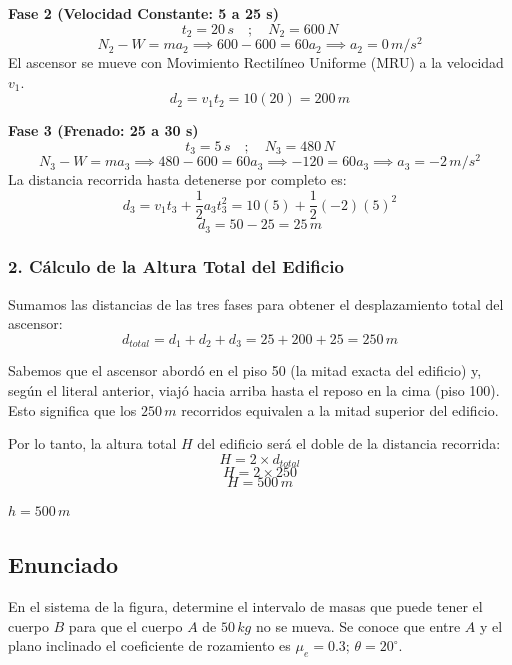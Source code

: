 \documentclass[12pt, a4paper]{article}
\begin{document}
\textbf{Fase 2 (Velocidad Constante: 5 a 25 s)}
$$ t_2 = 20 \, \si{s} \quad ; \quad N_2 = 600 \, \si{N} $$
$$ N_2 - W = m a_2 \implies 600 - 600 = 60 a_2 \implies a_2 = 0 \, \si{m/s^2} $$
El ascensor se mueve con Movimiento Rectilíneo Uniforme (MRU) a la velocidad $v_1$.
$$ d_2 = v_1 t_2 = 10 (20) = 200 \, \si{m} $$

\textbf{Fase 3 (Frenado: 25 a 30 s)}
$$ t_3 = 5 \, \si{s} \quad ; \quad N_3 = 480 \, \si{N} $$
$$ N_3 - W = m a_3 \implies 480 - 600 = 60 a_3 \implies -120 = 60 a_3 \implies a_3 = -2 \, \si{m/s^2} $$
La distancia recorrida hasta detenerse por completo es:
$$ d_3 = v_1 t_3 + \frac{1}{2} a_3 t_3^2 = 10(5) + \frac{1}{2} (-2) (5)^2 $$
$$ d_3 = 50 - 25 = 25 \, \si{m} $$

\subsubsection*{2. Cálculo de la Altura Total del Edificio}
Sumamos las distancias de las tres fases para obtener el desplazamiento total del ascensor:
$$ d_{total} = d_1 + d_2 + d_3 = 25 + 200 + 25 = 250 \, \si{m} $$

Sabemos que el ascensor abordó en el piso 50 (la mitad exacta del edificio) y, según el literal anterior, viajó hacia arriba hasta el reposo en la cima (piso 100).
Esto significa que los $250 \, \si{m}$ recorridos equivalen a la mitad superior del edificio. 

Por lo tanto, la altura total $H$ del edificio será el doble de la distancia recorrida:
$$ H = 2 \times d_{total} $$
$$ H = 2 \times 250 $$
$$ H = 500 \, \si{m} $$

\begin{tcolorbox}[colback=green!5!white, colframe=green!50!black, title=Respuesta Final]
\centering \Large $h = 500 \, \si{m}$
\end{tcolorbox}

\newpage

\subsection*{Enunciado}
En el sistema de la figura, determine el intervalo de masas que puede tener el cuerpo $B$ para que el cuerpo $A$ de $50\,\si{kg}$ no se mueva. Se conoce que entre $A$ y el plano inclinado el coeficiente de rozamiento es $\mu_e = 0.3$; $\theta = 20^\circ$.
\end{document}
